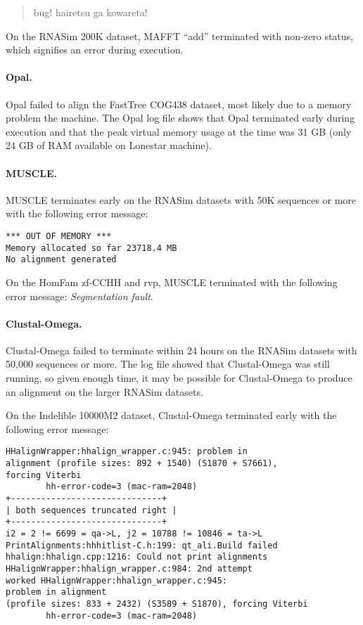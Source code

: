 \begin{quote}
bug! hairetsu ga kowareta!
\end{quote}

On the RNASim 200K dataset, MAFFT ``add'' terminated with non-zero status, which signifies an error during execution.  

\paragraph{Opal.}  Opal failed to align the FastTree COG438 dataset, most likely due to a memory problem the machine.  The Opal log file shows that Opal terminated early during execution and that the peak virtual memory usage at the time was 31 GB (only 24 GB of RAM available on Lonestar machine).  

\paragraph{MUSCLE.} MUSCLE terminates early on the RNASim datasets with 50K sequences or more with the following error message:

\begin{verbatim}
*** OUT OF MEMORY *** 
Memory allocated so far 23718.4 MB 
No alignment generated
\end{verbatim}
On the HomFam zf-CCHH and rvp, MUSCLE terminated with the following error message: \emph{Segmentation fault}.

\paragraph{Clustal-Omega.}
Clustal-Omega failed to terminate within 24 hours on the RNASim datasets with 50,000 sequences or more.  The log file showed that Clustal-Omega was still running, so given enough time, it may be possible for Clustal-Omega to produce an alignment on the larger RNASim datasets.  

On the Indelible 10000M2 dataset, Clustal-Omega terminated early with the following error message:

\begin{verbatim}
HHalignWrapper:hhalign_wrapper.c:945: problem in 
alignment (profile sizes: 892 + 1540) (S1870 + S7661), 
forcing Viterbi
        hh-error-code=3 (mac-ram=2048)
+------------------------------+
| both sequences truncated right |
+------------------------------+
i2 = 2 != 6699 = qa->L, j2 = 10788 != 10846 = ta->L
PrintAlignments:hhhitlist-C.h:199: qt_ali.Build failed
hhalign:hhalign.cpp:1216: Could not print alignments
HHalignWrapper:hhalign_wrapper.c:984: 2nd attempt 
worked HHalignWrapper:hhalign_wrapper.c:945: 
problem in alignment
(profile sizes: 833 + 2432) (S3589 + S1870), forcing Viterbi
        hh-error-code=3 (mac-ram=2048)
\end{verbatim}


